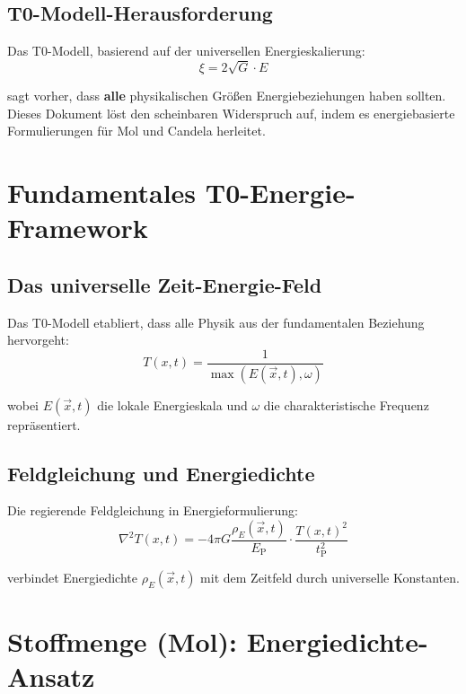 \documentclass[12pt,a4paper]{article}
\newcommand{\xipar}{\xi}
\newcommand{\EP}{E_{\text{P}}}
\newcommand{\tP}{t_{\text{P}}}
\newcommand{\Tfield}{T(x,t)}
\newcommand{\rhoE}{\rho_E}
\begin{document}
	\subsection{T0-Modell-Herausforderung}
	\label{subsec:t0_herausforderung}
	
	Das T0-Modell, basierend auf der universellen Energieskalierung:
	\begin{equation}
		\xipar = 2\sqrt{G} \cdot E
		\label{eq:t0_fundamental}
	\end{equation}
	
	sagt vorher, dass \textbf{alle} physikalischen Größen Energiebeziehungen haben sollten. Dieses Dokument löst den scheinbaren Widerspruch auf, indem es energiebasierte Formulierungen für Mol und Candela herleitet.
	
	\section{Fundamentales T0-Energie-Framework}
	\label{sec:t0_framework}
	
	\subsection{Das universelle Zeit-Energie-Feld}
	\label{subsec:universelles_zeit_energie}
	
	Das T0-Modell etabliert, dass alle Physik aus der fundamentalen Beziehung hervorgeht:
	\begin{equation}
		\Tfield = \frac{1}{\max(E(\vec{x},t), \omega)}
		\label{eq:t0_zeitfeld}
	\end{equation}
	
	wobei $E(\vec{x},t)$ die lokale Energieskala und $\omega$ die charakteristische Frequenz repräsentiert.
	
	\subsection{Feldgleichung und Energiedichte}
	\label{subsec:feldgleichung}
	
	Die regierende Feldgleichung in Energieformulierung:
	\begin{equation}
		\nabla^2 \Tfield = -4\pi G \frac{\rhoE(\vec{x},t)}{\EP} \cdot \frac{\Tfield^2}{\tP^2}
		\label{eq:t0_feldgleichung}
	\end{equation}
	
	verbindet Energiedichte $\rhoE(\vec{x},t)$ mit dem Zeitfeld durch universelle Konstanten.
	
	\section{Stoffmenge (Mol): Energiedichte-Ansatz}
	\label{sec:mol_herleitung}
	
\end{document}
